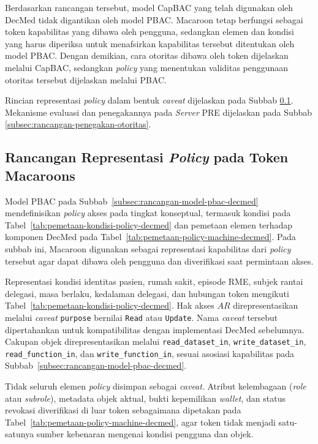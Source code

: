 \documentclass[bahasa, 12pt, a4paper, onecolumn, oneside, final]{report}
\begin{document}
Berdasarkan rancangan tersebut, model CapBAC yang telah digunakan oleh DecMed tidak digantikan oleh model PBAC. Macaroon tetap berfungsi sebagai token kapabilitas yang dibawa oleh pengguna, sedangkan elemen dan kondisi yang harus diperiksa untuk menafsirkan kapabilitas tersebut ditentukan oleh model PBAC. Dengan demikian, cara otoritas dibawa oleh token dijelaskan melalui CapBAC, sedangkan \textit{policy} yang menentukan validitas penggunaan otoritas tersebut dijelaskan melalui PBAC.

Rincian representasi \textit{policy} dalam bentuk \textit{caveat} dijelaskan pada Subbab \ref{subsec:rancangan-token-macaroons}. Mekanisme evaluasi dan penegakannya pada \textit{Server} PRE dijelaskan pada Subbab \ref{subsec:rancangan-penegakan-otoritas}.
\subsection{Rancangan Representasi \textit{Policy} pada Token Macaroons}
\label{subsec:rancangan-token-macaroons}

Model PBAC pada Subbab~\ref{subsec:rancangan-model-pbac-decmed} mendefinisikan \textit{policy} akses pada tingkat konseptual, termasuk kondisi pada Tabel~\ref{tab:pemetaan-kondisi-policy-decmed} dan pemetaan elemen terhadap komponen DecMed pada Tabel~\ref{tab:pemetaan-policy-machine-decmed}. Pada subbab ini, Macaroon digunakan sebagai representasi kapabilitas dari \textit{policy} tersebut agar dapat dibawa oleh pengguna dan diverifikasi saat permintaan akses.

Representasi kondisi identitas pasien, rumah sakit, episode RME, subjek rantai delegasi, masa berlaku, kedalaman delegasi, dan hubungan token mengikuti Tabel~\ref{tab:pemetaan-kondisi-policy-decmed}. Hak akses $AR$ direpresentasikan melalui \textit{caveat} \texttt{purpose} bernilai \texttt{Read} atau \texttt{Update}. Nama \textit{caveat} tersebut dipertahankan untuk kompatibilitas dengan implementasi DecMed sebelumnya. Cakupan objek direpresentasikan melalui \texttt{read\_dataset\_in}, \texttt{write\_dataset\_in}, \texttt{read\_function\_in}, dan \texttt{write\_function\_in}, sesuai asosiasi kapabilitas pada Subbab~\ref{subsec:rancangan-model-pbac-decmed}.

Tidak seluruh elemen \textit{policy} disimpan sebagai \textit{caveat}. Atribut kelembagaan (\textit{role} atau \textit{subrole}), metadata objek aktual, bukti kepemilikan \textit{wallet}, dan status revokasi diverifikasi di luar token sebagaimana dipetakan pada Tabel~\ref{tab:pemetaan-policy-machine-decmed}, agar token tidak menjadi satu-satunya sumber kebenaran mengenai kondisi pengguna dan objek.
\end{document}
